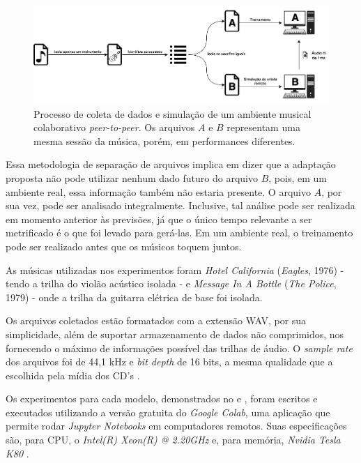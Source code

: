 \begin{figure}[htbp]
\centering
\includegraphics[width=1\textwidth]{images/data-gathering.png}
\caption{Processo de coleta de dados e simulação de um ambiente musical colaborativo \textit{peer-to-peer}. Os arquivos $A$ e $B$ representam uma mesma sessão da música, porém, em performances diferentes.}
\label{fig:data_gathering}
\end{figure}

Essa metodologia de separação de arquivos implica em dizer que a adaptação proposta não pode utilizar nenhum dado futuro do arquivo $B$, pois, em um ambiente real, essa informação também não estaria presente. O arquivo $A$, por sua vez, pode ser analisado integralmente. Inclusive, tal análise pode ser realizada em momento anterior às previsões, já que o único tempo relevante a ser metrificado é o que foi levado para gerá-las. Em um ambiente real, o treinamento pode ser realizado antes que os músicos toquem juntos.

As músicas utilizadas nos experimentos foram \textit{Hotel California} (\textit{Eagles}, 1976) - tendo a trilha do violão acústico isolada - e \textit{Message In A Bottle} (\textit{The Police}, 1979) - onde a trilha da guitarra elétrica de base foi isolada.

Os arquivos coletados estão formatados com a extensão WAV, por sua simplicidade, além de suportar armazenamento de dados não comprimidos, nos fornecendo o máximo de informações possível das trilhas de áudio. O \textit{sample rate} dos arquivos foi de 44,1 kHz e \textit{bit depth} de 16 bits, a mesma qualidade que a escolhida pela mídia dos CD's \cite{cd_quality}.

Os experimentos para cada modelo, demonstrados no  e , foram escritos e executados utilizando a versão gratuita do \textit{Google Colab}, uma aplicação que permite rodar \textit{Jupyter Notebooks} em computadores remotos. Suas especificações são, para CPU, o \textit{Intel(R) Xeon(R) @ 2.20GHz} e, para memória, \textit{Nvidia Tesla K80} \cite{colab_specs}.